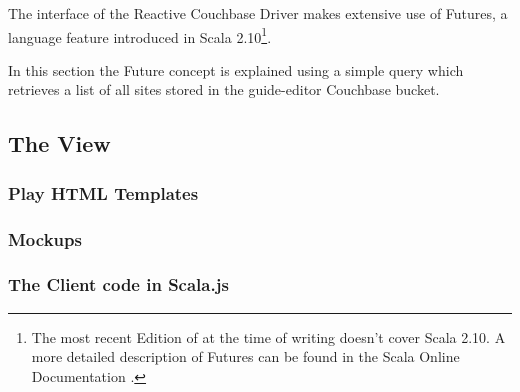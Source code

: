 The interface of the Reactive Couchbase Driver makes extensive use of Futures, a language feature introduced in Scala 2.10\footnote{The most recent Edition of \cite{scala-book} at the time of writing doesn't cover Scala 2.10. A more detailed description of Futures can be found in the Scala Online Documentation \cite{scala-futures}.}.

In this section the Future concept is explained using a simple query which retrieves a list of all sites stored in the guide-editor Couchbase bucket.


\subsection{The View}

\subsubsection{Play HTML Templates}

\subsubsection{Mockups}

\subsubsection{The Client code in Scala.js}



